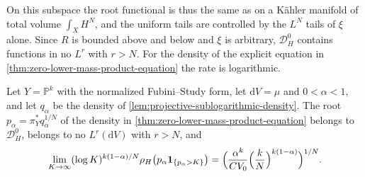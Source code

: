 On this subspace the root functional is thus the same as on a K\"ahler manifold of total volume $\int_XH^N$, and the uniform tails are controlled by the $L^N$ tails of $\xi$ alone. Since $R$ is bounded above and below and $\xi$ is arbitrary, $\mathcal D_H^0$ contains functions in no $L^r$ with $r>N$. For the density of the explicit equation in \cref{thm:zero-lower-mass-product-equation} the rate is logarithmic.

\begin{example}\label{ex:closed-factor-logarithmic-tails}
Let $Y=\mathbb P^k$ with the normalized Fubini--Study form, let $\mathrm{d}V=\mu$ and $0<\alpha<1$, and let $q_\alpha$ be the density of \cref{lem:projective-sublogarithmic-density}. The root $p_\alpha=\pi_Y^*q_\alpha^{1/N}$ of the density in \cref{thm:zero-lower-mass-product-equation} belongs to $\mathcal D_H^0$, belongs to no $L^r(\mathrm{d}V)$ with $r>N$, and
\[
 \lim_{K\to\infty}(\log K)^{k(1-\alpha)/N}\rho_H\bigl(p_\alpha\mathbf1_{\{p_\alpha>K\}}\bigr)
 =\Bigl(\frac{\alpha^k}{CV_0}\Bigl(\frac kN\Bigr)^{k(1-\alpha)}\Bigr)^{1/N}.
\]
\end{example}

